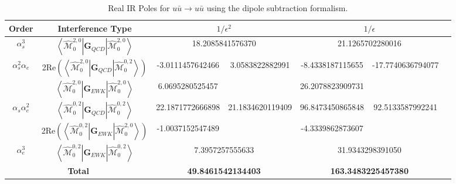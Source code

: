 \documentclass[a4paper]{article}
\def \MBra#1#2#3{\left<\hat{\mathcal{M}}_{#1}^{#2,#3}\right|}
\def \MKet#1#2#3{\left|\hat{\mathcal{M}}_{#1}^{#2,#3}\right>}
\begin{document}
\begin{table}[]
 \begin{tabular}{|c|c|c|c|c|c|c|}\hline
 Order& Interference Type
 & \multicolumn{2}{c}{$1/\epsilon^{2}$} 
 & \multicolumn{2}{|c|}{$1/\epsilon$}\\\hline
 $\alpha_s^3$                           
 & $\MBra{0}{2}{0}\textbf{G}_{QCD}\MKet{0}{2}{0}$
 & \multicolumn{2}{|c|}{18.2085841576370} 
 & \multicolumn{2}{|c|}{21.1265702280016} \\\hline
 \multirow{2}{*}{$\alpha_s^2\alpha_e$}                                                        
 & 2Re$\left(\MBra{0}{2}{0}\textbf{G}_{QCD}\MKet{0}{0}{2}\right)$
 & -3.0111457642466 & \multirow{2}{*}{3.0583822882991} 
 & -8.4338187115655 & \multirow{2}{*}{-17.7740636794077} \\
 & $\MBra{0}{2}{0}\textbf{G}_{EWK}\MKet{0}{2}{0}$
 & 6.0695280525457 && 26.2078823909731 &\\\hline
 \multirow{2}{*}{$\alpha_s\alpha_e^2$}                                                  
 & $\MBra{0}{0}{2}\textbf{G}_{QCD}\MKet{0}{0}{2}$
 & 22.1871772666898 & \multirow{2}{*}{21.1834620119409} 
 & 96.8473450865848 & \multirow{2}{*}{92.5133587992241} \\
 & 2Re$\left(\MBra{0}{0}{2}\textbf{G}_{EWK}\MKet{0}{2}{0}\right)$ 
 & -1.0037152547489 && -4.3339862873607 &\\\hline
 $\alpha_e^3$                                                                             
 & $\MBra{0}{0}{2}\textbf{G}_{EWK}\MKet{0}{0}{2}$
 & \multicolumn{2}{|c|}{7.3957257555633} 
 & \multicolumn{2}{|c|}{31.9343298391050} \\\hline
   \multicolumn{2}{|c|}{\textbf{Total}}     
 & \multicolumn{2}{|c|}{\textbf{49.8461542134403}} 
 & \multicolumn{2}{|c|}{\textbf{163.3483225457380}}\\\hline
 \end{tabular}
 \caption{Real IR Poles for $u\bar u\longrightarrow u\bar u$ using the dipole subtraction formalism.}
 \label{real_uubar}


\end{table}
\end{document}
